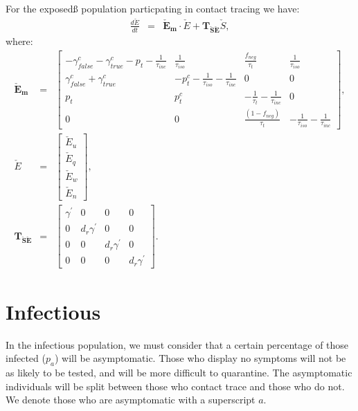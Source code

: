 \documentclass[notitlepage, superscriptaddress]{revtex4-2}
\begin{document}
For the exposedß population particpating in contact tracing we have:
\begin{eqnarray}
\frac{d\check{E}}{dt} &=& \boldsymbol{\check{E}_{m}} \cdot \check{E} + \boldsymbol{T_{\check{S}\check{E}}}  \check{S}, 
\end{eqnarray}
where:
\begin{eqnarray}
\boldsymbol{\check{E}_{m}} &=&
\begin{bmatrix}
 -\gamma^{c}_{false} -\gamma^{c}_{true} - p_{t} -\frac{1}{\tau_{inc}} & \frac{1}{\tau_{iso}}  & \frac{f_{neg}}{\tau_{t}} & \frac{1}{\tau_{iso}} \\
\gamma^{c}_{false} + \gamma^{c}_{true}    &  -p^{c}_{t}  - \frac{1}{\tau_{iso}} - \frac{1}{\tau_{inc}}      &  0    & 0  \\
p_{t}     &  p^{c}_{t}                  &  -\frac{1}{\tau_{t}}  - \frac{1}{\tau_{inc}}  & 0 \\
0 & 0 & \frac{(1-f_{neg})}{\tau_{t}}  & -\frac{1}{\tau_{iso}}  -  \frac{1}{\tau_{inc}} 
\end{bmatrix}, \\ 
%
\check{E} &=& 
\begin{bmatrix}
\check{E}_{u} \\ \check{E}_{q} \\ \check{E}_{w}\\ \check{E}_{n}
\end{bmatrix}, \\ 
%
\boldsymbol{T_{\check{S}\check{E}}} &=&
\begin{bmatrix}
\gamma^{'}  & 0                 & 0                 & 0 \\ 
 0          & d_{r} \gamma^{'}  & 0                 & 0 \\ 
 0          & 0                 & d_{r} \gamma^{'}  & 0  \\
 0          & 0                 & 0                 & d_{r} \gamma^{'}
\end{bmatrix}.
\end{eqnarray}


\section{Infectious}
In the infectious population, we must consider that a certain percentage of those infected ($p_{a}$) will be asymptomatic. Those who display no symptoms will not be as likely to be tested, and will be more difficult to quarantine. The asymptomatic individuals will be split between those who contact trace and those who do not. We denote those who are asymptomatic with a superscript $a$. 
\end{document}
